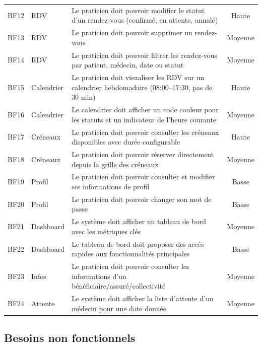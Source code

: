 \begin{longtable}{@{} c l p{7.5cm} c @{}}
BF12 & RDV & Le praticien doit pouvoir modifier le statut d'un rendez-vous (confirmé, en attente, annulé) & Haute \\
BF13 & RDV & Le praticien doit pouvoir supprimer un rendez-vous & Moyenne \\
BF14 & RDV & Le praticien doit pouvoir filtrer les rendez-vous par patient, médecin, date ou statut & Moyenne \\
BF15 & Calendrier & Le praticien doit visualiser les RDV sur un calendrier hebdomadaire (08:00--17:30, pas de 30 min) & Haute \\
BF16 & Calendrier & Le calendrier doit afficher un code couleur pour les statuts et un indicateur de l'heure courante & Moyenne \\
BF17 & Créneaux & Le praticien doit pouvoir consulter les créneaux disponibles avec durée configurable & Haute \\
BF18 & Créneaux & Le praticien doit pouvoir réserver directement depuis la grille des créneaux & Moyenne \\
BF19 & Profil & Le praticien doit pouvoir consulter et modifier ses informations de profil & Basse \\
BF20 & Profil & Le praticien doit pouvoir changer son mot de passe & Basse \\
BF21 & Dashboard & Le système doit afficher un tableau de bord avec les métriques clés & Moyenne \\
BF22 & Dashboard & Le tableau de bord doit proposer des accès rapides aux fonctionnalités principales & Basse \\
BF23 & Infos & Le praticien doit pouvoir consulter les informations d'un bénéficiaire/assuré/collectivité & Moyenne \\
BF24 & Attente & Le système doit afficher la liste d'attente d'un médecin pour une date donnée & Moyenne \\
\end{longtable}

\subsection{Besoins non fonctionnels}

